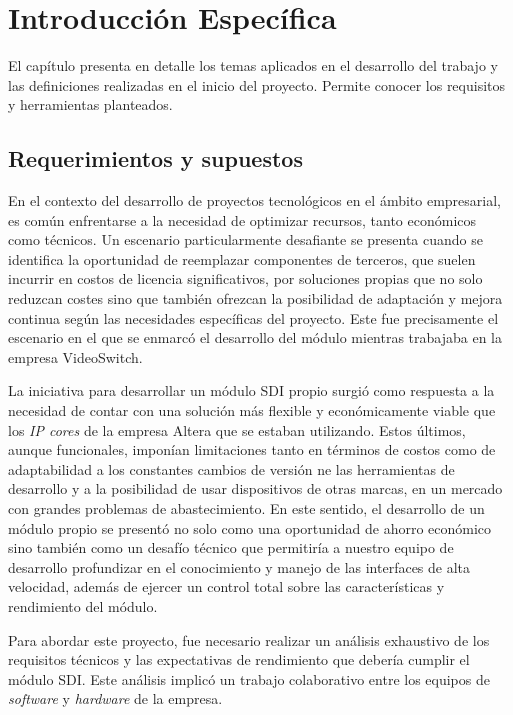 \chapter{Introducción Específica}\label{Chapter2}

El capítulo presenta en detalle los temas aplicados en el desarrollo del trabajo y
las definiciones realizadas en el inicio del proyecto. Permite conocer los requisitos
y herramientas planteados.

\section{Requerimientos y supuestos}

  En el contexto del desarrollo de proyectos tecnológicos en el ámbito empresarial,
  es común enfrentarse a la necesidad de optimizar recursos, tanto económicos como
  técnicos. Un escenario particularmente desafiante se presenta cuando se
  identifica la oportunidad de reemplazar componentes de terceros, que suelen
  incurrir en costos de licencia significativos, por soluciones propias que no
  solo reduzcan costes sino que también ofrezcan la posibilidad de adaptación y
  mejora continua según las necesidades específicas del proyecto. Este fue
  precisamente el escenario en el que se enmarcó el desarrollo del módulo
  mientras trabajaba en la empresa VideoSwitch.

  La iniciativa para desarrollar un módulo SDI propio surgió como respuesta a la
  necesidad de contar con una solución más flexible y económicamente viable que
  los \textit{IP cores} de la empresa Altera que se estaban utilizando. Estos
  últimos, aunque funcionales, imponían limitaciones tanto en términos de costos
  como de adaptabilidad a los constantes cambios de versión ne las herramientas
  de desarrollo y a la posibilidad de usar dispositivos de otras marcas, en un
  mercado con grandes problemas de abastecimiento. En este sentido, el desarrollo
  de un módulo propio se presentó no solo como una oportunidad de ahorro económico
  sino también como un desafío técnico que permitiría a nuestro equipo de
  desarrollo profundizar en el conocimiento y manejo de las interfaces de alta
  velocidad, además de ejercer un control total sobre las características y
  rendimiento del módulo.

  Para abordar este proyecto, fue necesario realizar un análisis exhaustivo de
  los requisitos técnicos y las expectativas de rendimiento que debería cumplir
  el módulo SDI\@. Este análisis implicó un trabajo colaborativo entre los
  equipos de \textit{software} y \textit{hardware} de la empresa.

